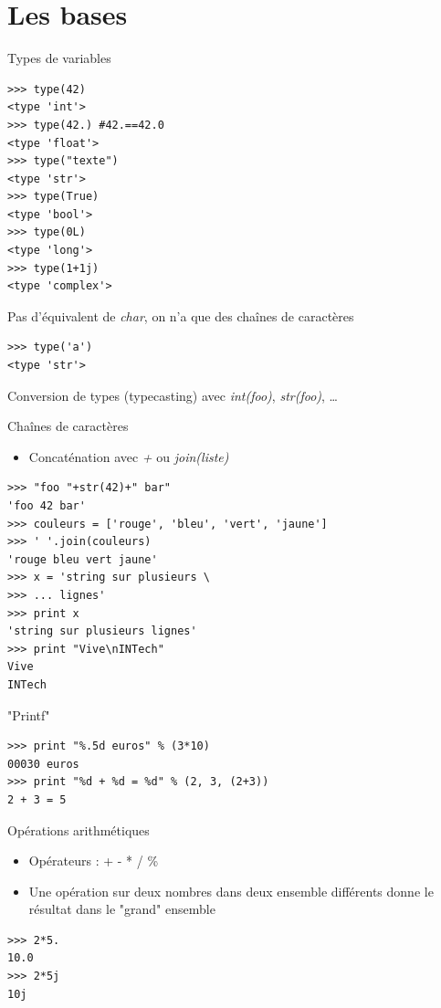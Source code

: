 \documentclass{beamer}
\begin{document}
\section{Les bases}

\begin{frame}[fragile]{Types de variables}
\begin{lstlisting}[multicols=2]
>>> type(42)
<type 'int'>
>>> type(42.) #42.==42.0
<type 'float'>
>>> type("texte")
<type 'str'>
>>> type(True)
<type 'bool'>
>>> type(0L)
<type 'long'>
>>> type(1+1j)
<type 'complex'>
\end{lstlisting}

Pas d'équivalent de \textit{char}, on n'a que des chaînes de caractères
\begin{lstlisting}
>>> type('a')
<type 'str'>
\end{lstlisting}

Conversion de types (typecasting) avec \textit{int(foo)}, \textit{str(foo)}, \dots
\end{frame}

\begin{frame}[fragile]{Chaînes de caractères}
\begin{itemize}
 \item Concaténation avec \textit{+} ou \textit{join(liste)}
\end{itemize}

\begin{lstlisting}
>>> "foo "+str(42)+" bar"
'foo 42 bar'
>>> couleurs = ['rouge', 'bleu', 'vert', 'jaune']
>>> ' '.join(couleurs)
'rouge bleu vert jaune'
>>> x = 'string sur plusieurs \
>>> ... lignes'
>>> print x
'string sur plusieurs lignes'
>>> print "Vive\nINTech"
Vive
INTech
\end{lstlisting}
\end{frame}

\begin{frame}[fragile]{"Printf"}
\begin{lstlisting}
>>> print "%.5d euros" % (3*10)
00030 euros
>>> print "%d + %d = %d" % (2, 3, (2+3))
2 + 3 = 5
\end{lstlisting}

\end{frame}

\begin{frame}[fragile]{Opérations arithmétiques}
\begin{itemize}
 \item Opérateurs : + - * / \%
 \item Une opération sur deux nombres dans deux ensemble différents donne le résultat dans le "grand" ensemble
\end{itemize}

\begin{lstlisting}
>>> 2*5.
10.0
>>> 2*5j
10j
\end{lstlisting}

\end{frame}
\end{document}
